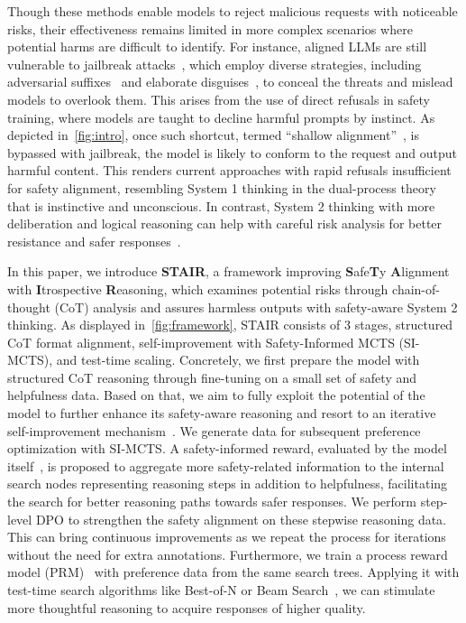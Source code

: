 Though these methods enable models to reject malicious requests with noticeable risks, their effectiveness remains limited in more complex scenarios where potential harms are difficult to identify. For instance, aligned LLMs are still vulnerable to jailbreak attacks~\cite{souly2024strongreject}, which employ diverse strategies, including adversarial suffixes~\cite{zou2023universal} and elaborate disguises~\cite{chaojailbreaking,zeng2024johnny}, to conceal the threats and mislead models to overlook them. This arises from the use of direct refusals in safety training, where models are taught to decline harmful prompts by instinct. As depicted in~\cref{fig:intro}, once such shortcut, termed ``shallow alignment''~\cite{qi2024safety}, is bypassed with jailbreak, the model is likely to conform to the request and output harmful content. This renders current approaches with rapid refusals insufficient for safety alignment, resembling System 1 thinking in the dual-process theory~\cite{evans2003two} that is instinctive and unconscious. In contrast, System 2 thinking with more deliberation and logical reasoning can help with careful risk analysis for better resistance and safer responses~\cite{jaech2024openai}.



In this paper, we introduce \textbf{STAIR}, a framework improving \textbf{S}afe\textbf{T}y \textbf{A}lignment with \textbf{I}trospective \textbf{R}easoning, which examines potential risks through chain-of-thought (CoT) analysis and assures harmless outputs with safety-aware System 2 thinking. As displayed in~\cref{fig:framework}, STAIR consists of 3 stages, structured CoT format alignment, self-improvement with Safety-Informed MCTS (SI-MCTS), and test-time scaling.
Concretely, we first prepare the model with structured CoT reasoning through fine-tuning on a small set of safety and helpfulness data. Based on that, we aim to fully exploit the potential of the model to further enhance its safety-aware reasoning and resort to an iterative self-improvement mechanism~\cite{huang2023large,panglanguage}. We generate data for subsequent preference optimization with SI-MCTS. A safety-informed reward, evaluated by the model itself~\cite{yuanself}, is proposed to aggregate more safety-related information to the internal search nodes representing reasoning steps in addition to helpfulness, facilitating the search for better reasoning paths towards safer responses. We perform step-level DPO to strengthen the safety alignment on these stepwise reasoning data. This can bring continuous improvements as we repeat the process for iterations without the need for extra annotations. Furthermore, we train a process reward model (PRM)~\cite{lightmanlet} with preference data from the same search trees. Applying it with test-time search algorithms like Best-of-N or Beam Search~\cite{xie2024self}, we can stimulate more thoughtful reasoning to acquire responses of higher quality.



